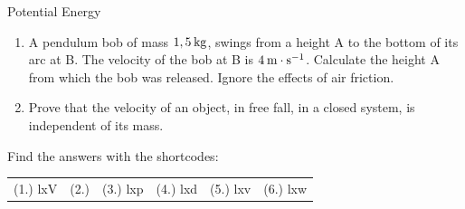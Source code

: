 \begin{exercises}{Potential Energy }
\begin{enumerate}[noitemsep, label=\textbf{\arabic*}. ]
 \item A pendulum bob of mass $1,5\phantom{\rule{2pt}{0ex}}\text{kg}$, swings from a height A to the bottom of its arc at B. The velocity of the bob at B is $4\phantom{\rule{2pt}{0ex}}\text{m}\ensuremath{\cdot}\text{s}{}^{-1}$. Calculate the height A from which the bob was released. Ignore the effects of air friction.\newline
\item Prove that the velocity of an object, in free fall, in a closed system, is independent of its mass.\newline
\end{enumerate}
\par {} Find the answers with the shortcodes:
 \par \begin{tabular}[h]{cccccc}
 (1.) lxV  & (2.) & (3.) lxp  &  (4.) lxd  &  (5.) lxv  &  (6.) lxw \end{tabular}
\end{exercises}
